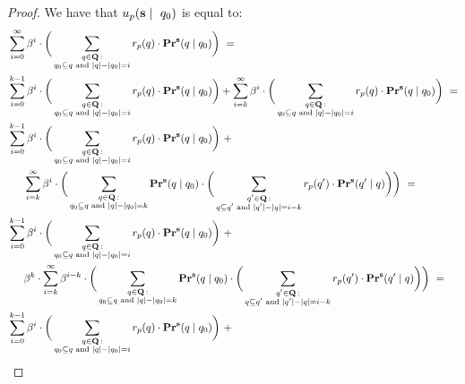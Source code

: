 \begin{proof} We have that $u_p(\mathbf{s} \mid \ q_0)$ is equal to:
\begin{align*}
&\sum_{i=0}^{\infty}\beta^{i} \cdot  \bigg(\sum_{\substack{q \in \bQ \,: \\ q_0 \subseteq q \text{ {\rm and} } |q| - |q_0| = i}} r_p(q) \cdot 
\pr^{\bs}(q \mid q_0)\bigg) \ =\\
&\sum_{i=0}^{k-1} \beta^i \cdot \bigg(\sum_{\substack{q \in \bQ \,: \\ q_0 \subseteq q \text{ {\rm and} } |q| - |q_0| = i}}
r_p(q) \cdot \pr^{\bs}(q \mid q_0)\bigg) + 
\sum_{i=k}^{\infty}\beta^{i} \cdot  \bigg(\sum_{\substack{q \in \bQ \,: \\ q_0 \subseteq q \text{ {\rm and} } |q| - |q_0| = i}} r_p(q) \cdot 
\pr^{\bs}(q \mid q_0)\bigg)\ = \\
&  \sum_{i=0}^{k-1} \beta^i \cdot \bigg(\sum_{\substack{q \in \bQ \,: \\ q_0 \subseteq q \text{ {\rm and} } |q| - |q_0| = i}} r_p(q) \cdot \pr^{\bs}(q \mid q_0)\bigg) \ + \\
& \hspace{15pt} \sum_{i=k}^{\infty}\beta^{i} \cdot  \bigg(
\sum_{\substack{q \in \bQ \,: \\ q_0 \subseteq q \text{ {\rm and} } |q| - |q_0| = k}} \pr^{\bs}(q \mid q_0) \cdot
\bigg(\sum_{\substack{q' \in \bQ \,: \\ q \subseteq q' \text{ {\rm and} } |q'| - |q| = i-k}} r_p(q') \cdot 
\pr^{\bs}(q' \mid q)\bigg)\bigg)\ = \\
& \sum_{i=0}^{k-1} \beta^i \cdot \bigg(\sum_{\substack{q \in \bQ \,: \\ q_0 \subseteq q \text{ {\rm and} } |q| - |q_0| = i}} r_p(q) \cdot \pr^{\bs}(q \mid q_0)\bigg) \ + \\
& \hspace{15pt}
\beta^k \cdot \sum_{i=k}^{\infty}\beta^{i-k} \cdot  \bigg(
\sum_{\substack{q \in \bQ \,: \\ q_0 \subseteq q \text{ {\rm and} } |q| - |q_0| = k}} \pr^{\bs}(q \mid q_0) \cdot
\bigg(\sum_{\substack{q' \in \bQ \,: \\ q \subseteq q' \text{ {\rm and} } |q'| - |q| = i-k}} r_p(q') \cdot 
\pr^{\bs}(q' \mid q)\bigg)\bigg)\ = \\
& \sum_{i=0}^{k-1} \beta^i \cdot \bigg(\sum_{\substack{q \in \bQ \,: \\ q_0 \subseteq q \text{ {\rm and} } |q| - |q_0| = i}} r_p(q) \cdot \pr^{\bs}(q \mid q_0)\bigg) \ + \\

\end{align*}
\end{proof}
